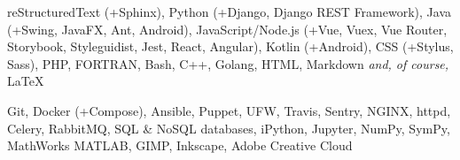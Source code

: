 
\sectiondescription
{
reStructuredText (+Sphinx),
Python (+Django, Django REST Framework),
Java (+Swing, JavaFX, Ant, Android),
JavaScript/Node.js (+Vue, Vuex, Vue Router, Storybook, Styleguidist, Jest, React, Angular),
Kotlin (+Android),
CSS (+Stylus, Sass),
PHP, FORTRAN,
Bash, C++, Golang,
HTML, Markdown
\textit{and, of course,} {\selectfont\LaTeX}
}

\sectiondescription
{
Git,
Docker (+Compose),
Ansible, Puppet, UFW,
Travis, Sentry,
NGINX, httpd, Celery, RabbitMQ, SQL \& NoSQL databases,
iPython, Jupyter, NumPy, SymPy, MathWorks MATLAB,
GIMP, Inkscape, Adobe Creative Cloud
}
